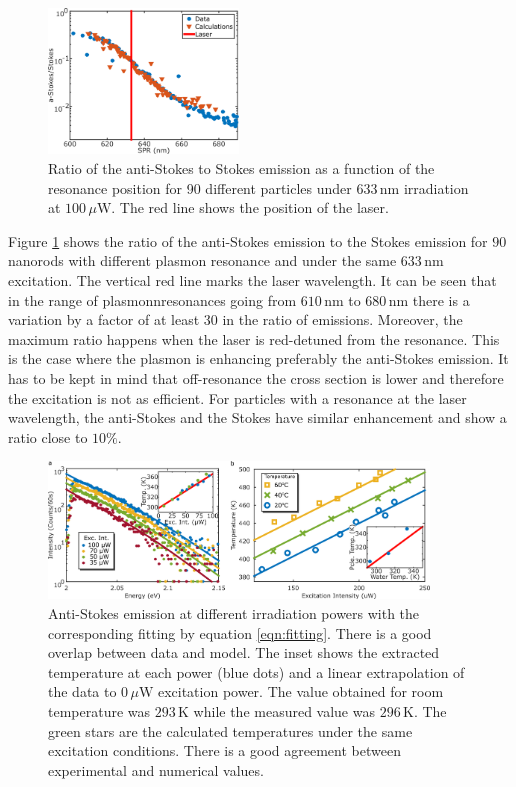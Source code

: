 \documentclass[journal=nalefd,manuscript=letter]{achemso}
\newcommand{\K}{\ensuremath{\,\textrm{K}}}
\newcommand{\nm}{\ensuremath{\,\textrm{nm}}}
\newcommand{\uW}{\ensuremath{\,\mu\textrm{W}}}
\begin{document}
\begin{figure}[htp] \centering
\includegraphics[width=0.45\textwidth]{Figures/Supplementary/02_AS_vs_S_SPR/02_AS_vs_S_SPR.png}
\caption{Ratio of the anti-Stokes to Stokes emission as a function of the
resonance position for 90 different particles under $633\nm$
irradiation at $100\uW$. The red line shows the position of the laser.}
	\label{fig:ASS-ratio}
\end{figure}

Figure \ref{fig:ASS-ratio} shows the ratio of the anti-Stokes emission to the
Stokes emission for $90$ nanorods with different plasmon resonance and under the
same $633\nm$ excitation. The vertical red line marks the laser wavelength. It
can be seen that in the range of plasmonnresonances going from $610\nm$ to
$680\nm$ there is a variation by a factor of at least $30$ in the ratio of
emissions. Moreover, the maximum ratio happens when the laser is red-detuned
from the resonance. This is the case where the plasmon is enhancing preferably
the anti-Stokes emission. It has to be kept in mind that off-resonance the cross
section is lower and therefore the excitation is not as efficient. For particles
with a resonance at the laser wavelength, the anti-Stokes and the Stokes
have similar enhancement and show a ratio close to $10\%$.

\begin{figure}[htp] \centering
\includegraphics[width=0.90\textwidth]{Figures/03_Fit_Of_AS/03_Log_Fit_AS.png}
\caption{Anti-Stokes emission at different irradiation powers with the
corresponding fitting by equation \ref{eqn:fitting}. There is a good overlap
between data and model. The inset shows the extracted temperature at each
power (blue dots) and a linear extrapolation of the data to $0\uW$ excitation
power. The value obtained for room temperature was $293\K$ while the measured
value was $296\K$. The green stars are the calculated temperatures under the
same excitation conditions. There is a good agreement between experimental and
numerical values.}
	\label{fig:AS_in_Log}
\end{figure}
\end{document}
